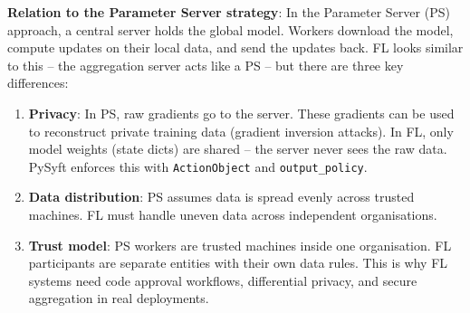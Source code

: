 \documentclass[11pt,a4paper]{article}
\begin{document}
\textbf{Relation to the Parameter Server strategy}: In the Parameter Server (PS)
approach, a central server holds the global model. Workers download the model, compute
updates on their local data, and send the updates back. FL looks similar to this -- the
aggregation server acts like a PS -- but there are three key differences:
\begin{enumerate}[nosep]
  \item \textbf{Privacy}: In PS, raw gradients go to the server. These gradients can be
        used to reconstruct private training data (gradient inversion attacks). In FL,
        only model weights (state dicts) are shared -- the server never sees the raw
        data. PySyft enforces this with \texttt{ActionObject} and \texttt{output\_policy}.
  \item \textbf{Data distribution}: PS assumes data is spread evenly across trusted
        machines. FL must handle uneven data across independent organisations.
  \item \textbf{Trust model}: PS workers are trusted machines inside one organisation.
        FL participants are separate entities with their own data rules. This is why FL
        systems need code approval workflows, differential privacy, and secure
        aggregation in real deployments.
\end{enumerate}
\end{document}
